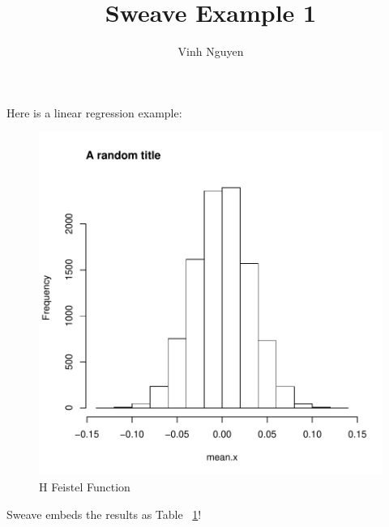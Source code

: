 \documentclass[a4paper]{article}
\title{Sweave Example 1}
\author{Vinh Nguyen}
\begin{document}
\maketitle
Here is a linear regression example:


\begin{figure}
\captionsetup{justification=raggedright, singlelinecheck=false}
\caption{H Feistel Function}
\label{fig:graph}
\includegraphics{test-figplot}
\end{figure}
Sweave embeds the results as Table ~\ref{fig:graph}!
\end{document}
